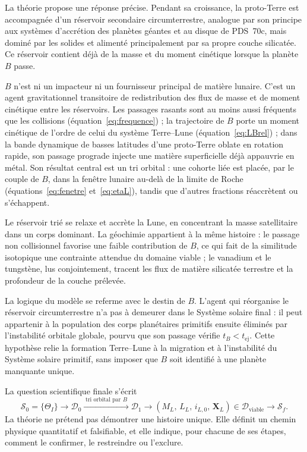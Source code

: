 \documentclass[11pt,a4paper,openany]{report}
\begin{document}
La théorie propose une réponse précise. Pendant sa croissance, la proto-Terre est accompagnée
d'un réservoir secondaire circumterrestre, analogue par son principe aux systèmes d'accrétion des
planètes géantes et au disque de PDS~70c, mais dominé par les solides et alimenté principalement
par sa propre couche silicatée. Ce réservoir contient déjà de la masse et du moment cinétique
lorsque la planète $B$ passe.

$B$ n'est ni un impacteur ni un fournisseur principal de matière lunaire. C'est un agent
gravitationnel transitoire de redistribution des flux de masse et de moment cinétique entre les
réservoirs. Les passages rasants sont au moins aussi fréquents que les collisions
(équation~\eqref{eq:frequence}) ; la trajectoire de $B$ porte un moment cinétique de l'ordre de celui
du système Terre--Lune (équation~\eqref{eq:LBrel}) ; dans la bande dynamique de basses latitudes d'une proto-Terre
oblate en rotation rapide, son passage prograde injecte une matière superficielle déjà appauvrie
en métal. Son résultat central est un tri orbital : une cohorte liée est placée, par le couple de $B$,
dans la fenêtre lunaire au-delà de la limite de Roche (équations~\eqref{eq:fenetre}
et~\eqref{eq:etaL}), tandis que d'autres fractions réaccrètent ou s'échappent.

Le réservoir trié se relaxe et accrète la Lune, en concentrant la masse satellitaire dans un corps
dominant. La géochimie appartient à la même histoire : le passage non collisionnel favorise une
faible contribution de $B$, ce qui fait de la similitude isotopique une contrainte attendue du
domaine viable ; le vanadium et le tungstène, lus conjointement, tracent les flux de matière
silicatée terrestre et la profondeur de la couche prélevée.

La logique du modèle se referme avec le destin de $B$. L'agent qui réorganise le réservoir
circumterrestre n'a pas à demeurer dans le Système solaire final : il peut appartenir à la population
des corps planétaires primitifs ensuite éliminés par l'instabilité orbitale globale, pourvu que son
passage vérifie $t_B<t_{\mathrm{ej}}$. Cette hypothèse relie la formation Terre--Lune à la migration
et à l'instabilité du Système solaire primitif, sans imposer que $B$ soit identifié à une planète
manquante unique.

La question scientifique finale s'écrit
\begin{equation}
\boxed{\;\mathcal{S}_0=\{\Theta_I\}\longrightarrow\mathcal{D}_0
\xrightarrow{\;\text{tri orbital par }B\;}\mathcal{D}_1\longrightarrow
\left(M_L,\,L_L,\,i_{L,0},\,\mathbf{X}_L\right)\in\mathcal{D}_{\mathrm{viable}}
\longrightarrow\mathcal{S}_f.\;}
\label{eq:question}
\end{equation}
La théorie ne prétend pas démontrer une histoire unique. Elle définit un chemin physique
quantitatif et falsifiable, et elle indique, pour chacune de ses étapes, comment le confirmer, le
restreindre ou l'exclure.
\end{document}
